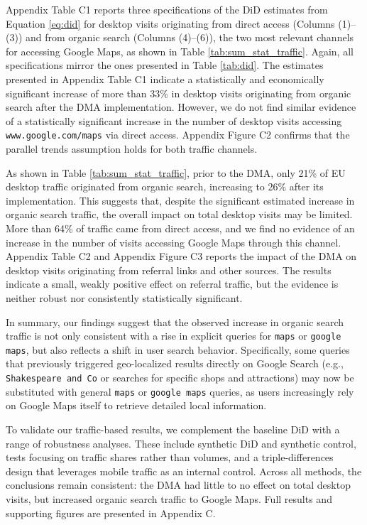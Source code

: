 \documentclass[11pt]{article}
\begin{document}
	
	
	\clearpage
	
	Appendix Table C1 reports three specifications of the DiD estimates from Equation \ref{eq:did} for desktop visits originating from direct access (Columns (1)–(3)) and from organic search (Columns (4)–(6)), the two most relevant channels for accessing Google Maps, as shown in Table \ref{tab:sum_stat_traffic}. Again, all specifications mirror the ones presented in Table \ref{tab:did}. The estimates presented in Appendix Table C1 indicate a statistically and economically significant increase of more than 33\% in desktop visits originating from organic search after the DMA implementation. However, we do not find similar evidence of a statistically significant increase in the number of desktop visits accessing \texttt{www.google.com/maps} via direct access. Appendix Figure C2 confirms that the parallel trends assumption holds for both traffic channels. 
	
	As shown in Table \ref{tab:sum_stat_traffic}, prior to the DMA, only 21\% of EU desktop traffic originated from organic search, increasing to 26\% after its implementation. This suggests that, despite the significant estimated increase in organic search traffic, the overall impact on total desktop visits may be limited.  More than 64\% of traffic came from direct access, and we find no evidence of an increase in the number of visits accessing Google Maps through this channel. Appendix Table C2 and Appendix Figure C3 reports the impact of the DMA on desktop visits originating from referral links and other sources. The results indicate a small, weakly positive effect on referral traffic, but the evidence is neither robust nor consistently statistically significant.
	
	In summary, our findings suggest that the observed increase in organic search traffic is not only consistent with a rise in explicit queries for \texttt{maps} or \texttt{google maps}, but also reflects a shift in user search behavior. Specifically, some queries that previously triggered geo-localized results directly on Google Search (e.g., \texttt{Shakespeare and Co} or searches for specific shops and attractions) may now be substituted with general \texttt{maps} or \texttt{google maps} queries, as users increasingly rely on Google Maps itself to retrieve detailed local information.
	
	To validate our traffic-based results, we complement the baseline DiD with a range of robustness analyses. These include synthetic DiD and synthetic control, tests focusing on traffic shares rather than volumes, and a triple-differences design that leverages mobile traffic as an internal control. Across all methods, the conclusions remain consistent: the DMA had little to no effect on total desktop visits, but increased organic search traffic to Google Maps. Full results and supporting figures are presented in Appendix C.
	
\end{document}

